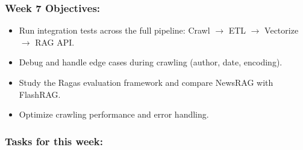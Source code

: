 \hypertarget{week-7-objectives}{%
\subsubsection{Week 7 Objectives:}}

\begin{itemize}
\tightlist
\item
  Run integration tests across the full pipeline: Crawl \(\rightarrow\)
  ETL \(\rightarrow\) Vectorize \(\rightarrow\) RAG API.
\item
  Debug and handle edge cases during crawling (author, date, encoding).
\item
  Study the Ragas evaluation framework and compare NewsRAG with
  FlashRAG.
\item
  Optimize crawling performance and error handling.
\end{itemize}

\hypertarget{tasks-for-this-week}{%
\subsubsection{Tasks for this week:}}

